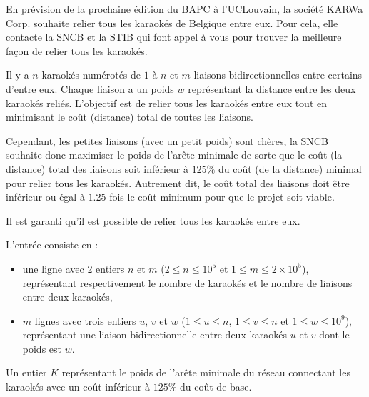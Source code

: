 \problemname{\problemyamlname}


En prévision de la prochaine édition du BAPC à l'UCLouvain, la société KARWa Corp. souhaite relier tous les karaokés de Belgique entre eux.
Pour cela, elle contacte la SNCB et la STIB qui font appel à vous pour trouver la meilleure façon de relier tous les karaokés.

Il y a $n$ karaokés numérotés de $1$ à $n$ et $m$ liaisons bidirectionnelles entre certains d'entre eux.
Chaque liaison a un poids $w$ représentant la distance entre les deux karaokés reliés.
L'objectif est de relier tous les karaokés entre eux tout en minimisant le coût (distance) total de toutes les liaisons.

Cependant, les petites liaisons (avec un petit poids) sont chères, la SNCB souhaite donc maximiser le poids de l'arête minimale de sorte que le coût (la distance) total des liaisons soit inférieur à $125\%$ du coût (de la distance) minimal pour relier tous les karaokés.
Autrement dit, le coût total des liaisons doit être inférieur ou égal à $1.25$ fois le coût minimum pour que le projet soit viable.

Il est garanti qu'il est possible de relier tous les karaokés entre eux.

\begin{Input}
	L'entrée consiste en :
	\begin{itemize}
		\item une ligne avec 2 entiers $n$ et $m$ ($2 \le n \le 10^5$ et $1 \le m \le 2 \times 10^5$), représentant respectivement le nombre de karaokés et le nombre de liaisons entre deux karaokés,
		\item $m$ lignes avec trois entiers $u$, $v$ et $w$ ($1 \le u \le n$, $1 \le v \le n$ et $1 \le w \le 10^9$), représentant une liaison bidirectionnelle entre deux karaokés $u$ et $v$ dont le poids est $w$.
	\end{itemize}
\end{Input}

\begin{Output}
	Un entier $K$ représentant le poids de l'arête minimale du réseau connectant les karaokés avec un coût inférieur à $125\%$ du coût de base.
\end{Output}
